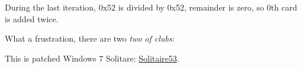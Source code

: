 During the last iteration, 0x52 is divided by 0x52, remainder is zero, so 0th card is added twice.

What a frustration, there are two \textit{two of clubs}:

\begin{figure}[H]
\centering
{}
\end{figure}

This is patched Windows 7 Solitare:
\href{\GitHubBlobMasterURL/examples/solitaire/53/Solitaire53.exe}{Solitaire53}.

